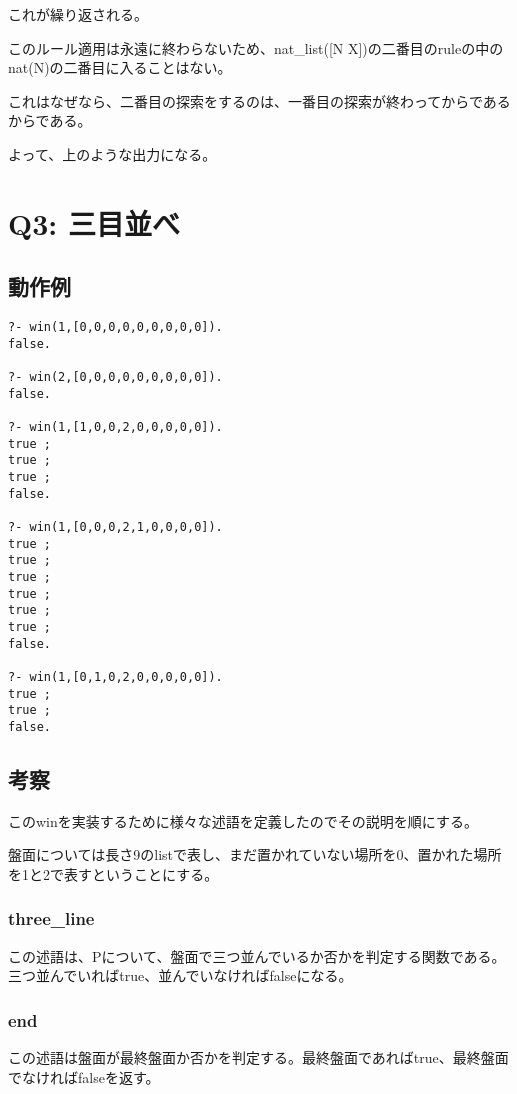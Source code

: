 \documentclass[uplatex,12pt]{jsarticle}
\begin{document}
これが繰り返される。

このルール適用は永遠に終わらないため、nat\_list([N \mid X])の二番目のruleの中の
nat(N)の二番目に入ることはない。

これはなぜなら、二番目の探索をするのは、一番目の探索が終わってからであるからである。

よって、上のような出力になる。



\section{Q3: 三目並べ}

\subsection{動作例}

\begin{lstlisting}[caption=動作例]
?- win(1,[0,0,0,0,0,0,0,0,0]).
false.

?- win(2,[0,0,0,0,0,0,0,0,0]).
false.

?- win(1,[1,0,0,2,0,0,0,0,0]).
true ;
true ;
true ;
false.

?- win(1,[0,0,0,2,1,0,0,0,0]).
true ;
true ;
true ;
true ;
true ;
true ;
false.

?- win(1,[0,1,0,2,0,0,0,0,0]).
true ;
true ;
false.
\end{lstlisting}

\subsection{考察}
このwinを実装するために様々な述語を定義したのでその説明を順にする。

盤面については長さ9のlistで表し、まだ置かれていない場所を0、置かれた場所を1と2で表すということにする。

\subsubsection{three\_line}
この述語は、Pについて、盤面で三つ並んでいるか否かを判定する関数である。三つ並んでいればtrue、並んでいなければfalseになる。

\subsubsection{end}
この述語は盤面が最終盤面か否かを判定する。最終盤面であればtrue、最終盤面でなければfalseを返す。
\end{document}
